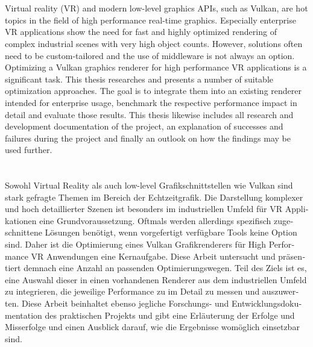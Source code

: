 \chapter{\abstractname}

Virtual reality (\gls{VR}) and modern low-level graphics APIs, such as Vulkan, are hot topics in the field of high performance real-time graphics. Especially enterprise VR applications show the need for fast and highly optimized rendering of complex industrial scenes with very high object counts. However, solutions often need to be custom-tailored and the use of middleware is not always an option. Optimizing a Vulkan graphics renderer for high performance VR applications is a significant task. This thesis researches and presents a number of suitable optimization approaches. The goal is to integrate them into an existing renderer intended for enterprise usage, benchmark the respective performance impact in detail and evaluate those results. This thesis likewise includes all research and development documentation of the project, an explanation of successes and failures during the project and finally an outlook on how the findings may be used further.  





\makeatletter
{}
{\renewcommand{\abstractname}{Kurzfassung}}
{\renewcommand{\abstractname}{Abstract}}
\makeatother

\chapter{\abstractname}

\begin{otherlanguage}{ngerman} %
Sowohl Virtual Reality als auch low-level Grafikschnittstellen wie Vulkan sind stark gefragte Themen im Bereich der Echtzeitgrafik. Die Darstellung komplexer und hoch detaillierter Szenen ist besonders im industriellen Umfeld für VR Applikationen eine Grundvoraussetzung. Oftmals werden allerdings spezifisch zugeschnittene Lösungen benötigt, wenn vorgefertigt verfügbare Tools keine Option sind. Daher ist die Optimierung eines Vulkan Grafikrenderers für High Performance VR Anwendungen eine Kernaufgabe. Diese Arbeit untersucht und präsentiert demnach eine Anzahl an passenden Optimierungswegen. Teil des Ziels ist es, eine Auswahl dieser in einen vorhandenen Renderer aus dem industriellen Umfeld zu integrieren, die jeweilige Performance zu im Detail zu messen und auszuwerten. Diese Arbeit beinhaltet ebenso jegliche Forschungs- und Entwicklungsdokumentation des praktischen Projekts und gibt eine Erläuterung der Erfolge und Misserfolge und einen Ausblick darauf, wie die Ergebnisse womöglich einsetzbar sind. 
\end{otherlanguage}


\makeatletter
{}
{\renewcommand{\abstractname}{Abstract}}
{\renewcommand{\abstractname}{Kurzfassung}}
\makeatother